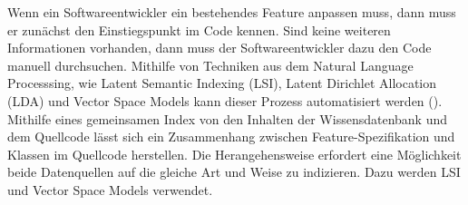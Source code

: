 Wenn ein Softwareentwickler ein bestehendes Feature anpassen muss, dann muss er zunächst den Einstiegspunkt im Code kennen.
Sind keine weiteren Informationen vorhanden, dann muss der Softwareentwickler dazu den Code manuell durchsuchen.
Mithilfe von Techniken aus dem Natural Language Processsing, wie Latent Semantic Indexing (LSI), Latent Dirichlet Allocation (LDA) und Vector Space Models kann dieser Prozess automatisiert werden (\cite{Dit_Revelle_Gethers_Poshyvanyk_2011}).
Mithilfe eines gemeinsamen Index von den Inhalten der Wissensdatenbank und dem Quellcode lässt sich ein Zusammenhang zwischen Feature-Spezifikation und Klassen im Quellcode herstellen.
Die Herangehensweise erfordert eine Möglichkeit beide Datenquellen auf die gleiche Art und Weise zu indizieren.
Dazu werden LSI und Vector Space Models verwendet.

